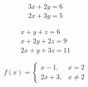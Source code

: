 \documentclass[12pt, a4paper, oneside]{article}
\begin{document}

\begin{eqnarray}
      3x+2y =6\\
      2x+3y = 5
\end{eqnarray}

\vspace{1,0cm}

\begin{eqnarray}
x + y + z = 6\\
  x + 2y + 2z =9\\
  2x + y + 3z = 11
\end{eqnarray}

\vspace{1,0cm}


\begin{equation}
f(x)=
\left\lbrace
\begin{array}{cc}
x - 1, & x = 2 \\
2x +3, & x \neq 2
 \end{array}
\right.
\end{equation}
\end{document}
